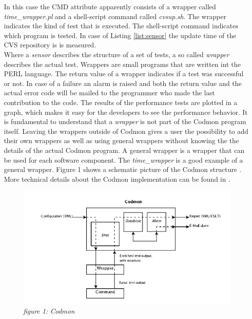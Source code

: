 \documentclass{article}
\begin{document}
\noindent In this case the CMD attribute apparently consists of a wrapper called \emph{time\_wrapper.pl} and a shell-script command called \emph{cvsup.sh}. The wrapper indicates the kind of test
that is executed. The shell-script command indicates which program is tested. In case of Listing \ref{list:sensor} the update time of the CVS repository is is measured.\\


\noindent Where a \emph{sensor} describes the structure of a set of tests, a so called \emph{wrapper} describes the actual test. Wrappers are small programs that are written int the PERL
language. The return value of a wrapper indicates if a test was successful or not. In case of a failure an alarm is raised and both the return value and the actual error code will be mailed to
the programmer who made the last contribution to the code. The results of the performance tests are plotted in a graph, which makes it easy for the developers to see the performance
behavior. It is fundamental to understand that a \emph{wrapper} is not part of the Codmon program itself. Leaving the wrappers outside of Codmon gives a user the possibility to add their own 
wrappers as well as using general wrappers without knowing the the details of the actual Codmon program. A general wrapper is a wrapper that can be used for each software component. The 
\emph{time\_wrapper} is a good example of a general wrapper. Figure 1 shows a schematic picture of the Codmon structure \cite{Codmon}. More technical details about the Codmon implementation 
can be found in \cite{Codmon}.

\begin{figure}[!ht]
  \caption{\emph{figure 1: Codmon}}
  \centering
    \includegraphics[scale=0.5]{codmon}
\end{figure}
\end{document}
